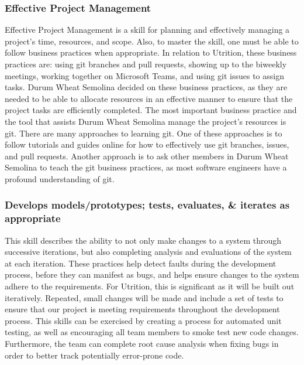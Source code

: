 \documentclass[12pt]{article}
\begin{document}
{\subsubsection{Effective Project Management}
Effective Project Management is a skill for planning and effectively managing a project’s time, resources, and scope. Also, to master the skill, one must be able to follow business practices when appropriate. In relation to Utrition, these business practices are: using git branches and pull requests, showing up to the biweekly meetings, working together on Microsoft Teams, and using git issues to assign tasks. Durum Wheat Semolina decided on these business practices, as they are needed to be able to allocate resources in an effective manner to ensure that the project tasks are efficiently completed. The most important business practice and the tool that assists Durum Wheat Semolina manage the project’s resources is git. There are many approaches to learning git. One of these approaches is to follow tutorials and guides online for how to effectively use git branches, issues, and pull requests. Another approach is to ask other members in Durum Wheat Semolina to teach the git business practices, as most software engineers have a profound understanding of git.
\subsubsection{Develops models/prototypes; tests, evaluates, \& iterates as 
appropriate}
This skill describes the ability to not only make changes to a system through 
successive iterations, but also completing analysis and evaluations of the 
system at each iteration. These practices help detect faults during the 
development process, before they can manifest as bugs, and helps ensure changes 
to the system adhere to the requirements. For Utrition, this is significant as 
it will be built out iteratively. Repeated, small changes will be made and 
include a set of tests to ensure that our project is meeting requirements 
throughout the development process. This skills can be exercised by creating a 
process for automated unit testing, as well as encouraging all team members to 
smoke test new code changes. Furthermore, the team can complete root cause 
analysis when fixing bugs in order to better track potentially error-prone code.

}
\end{document}
